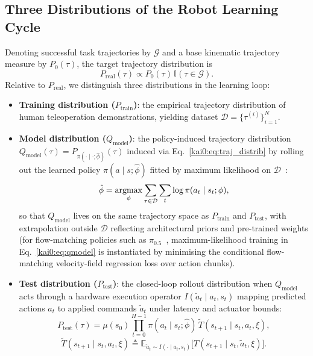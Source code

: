 \subsection{Three Distributions of the Robot Learning Cycle}\label{kai0:sec:distributions}
Denoting successful task trajectories by $\mathcal{G}$ and a base kinematic trajectory measure by $P_{0}(\tau)$, the target trajectory distribution is
\begin{equation}
  P_{\mathrm{real}}(\tau) \propto P_{0}(\tau)\,\mathbb{I}(\tau \in \mathcal{G}).
  \label{kai0:eq:preal}
\end{equation}
Relative to $P_{\mathrm{real}}$, we distinguish three distributions in the learning loop:
\begin{itemize}
  \item \textbf{Training distribution ($P_{\mathrm{train}}$)}: the empirical trajectory distribution of human teleoperation demonstrations, yielding dataset $\mathcal{D} = \{\tau^{(i)}\}_{i=1}^{N}$.
  \item \textbf{Model distribution ($Q_{\mathrm{model}}$)}: the policy-induced trajectory distribution $Q_{\mathrm{model}}(\tau) = P_{\pi(\cdot\mid\cdot;\hat{\phi})}(\tau)$ induced via Eq.~\eqref{kai0:eq:traj_distrib} by rolling out the learned policy $\pi(a \mid s; \hat{\phi})$ fitted by maximum likelihood on $\mathcal{D}$~\cite{ross2011dagger,osa2018algorithmic}:
  \begin{equation}
    \hat{\phi} = \mathop{\mathrm{argmax}}\limits_{\phi} \sum_{\tau \in \mathcal{D}} \sum_{t} \log \pi(a_t \mid s_t; \phi),
    \label{kai0:eq:qmodel}
  \end{equation}
  so that $Q_{\mathrm{model}}$ lives on the same trajectory space as $P_{\mathrm{train}}$ and $P_{\mathrm{test}}$, with extrapolation outside $\mathcal{D}$ reflecting architectural priors and pre-trained weights (for flow-matching policies such as $\pi_{0.5}$~\cite{black2024pi0,black2025pi05}, maximum-likelihood training in Eq.~\eqref{kai0:eq:qmodel} is instantiated by minimising the conditional flow-matching velocity-field regression loss over action chunks).
  \item \textbf{Test distribution ($P_{\mathrm{test}}$)}: the closed-loop rollout distribution when $Q_{\mathrm{model}}$ acts through a hardware execution operator $I(\tilde{a}_t \mid a_t, s_t)$ mapping predicted actions $a_t$ to applied commands $\tilde{a}_t$ under latency and actuator bounds:
  \begin{equation}
    P_{\mathrm{test}}(\tau) = \mu(s_0) \prod_{t=0}^{H-1} \pi(a_t \mid s_t; \hat{\phi})\, \tilde{T}(s_{t+1} \mid s_t, a_t, \xi),
    \label{kai0:eq:ptest}
  \end{equation}
  \begin{equation}
    \tilde{T}(s_{t+1} \mid s_t, a_t, \xi) \triangleq \mathbb{E}_{\tilde{a}_t \sim I(\cdot \mid a_t, s_t)} \big[ T(s_{t+1} \mid s_t, \tilde{a}_t, \xi) \big].
    \label{kai0:eq:ttilde}
  \end{equation}
\end{itemize}
